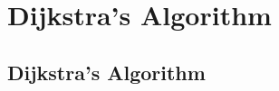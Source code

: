 \documentclass[../maths.tex]{subfiles}
\begin{document}
\chapter{Dijkstra's Algorithm}
\section{Dijkstra's Algorithm}
\end{document}

